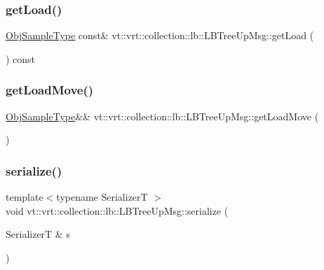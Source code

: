 \subsubsection{\texorpdfstring{get\+Load()}{getLoad()}}
{\footnotesize\ttfamily \hyperlink{structvt_1_1vrt_1_1collection_1_1lb_1_1_hier_l_b_types_a597a60d517207b90e8c7984eac434e8f}{Obj\+Sample\+Type} const\& vt\+::vrt\+::collection\+::lb\+::\+L\+B\+Tree\+Up\+Msg\+::get\+Load (\begin{DoxyParamCaption}{ }\end{DoxyParamCaption}) const\hspace{0.3cm}{\ttfamily [inline]}}

\mbox{\label{structvt_1_1vrt_1_1collection_1_1lb_1_1_l_b_tree_up_msg_aa5c9744fbb8557e3ec37846d9c8e09e7}} 
\subsubsection{\texorpdfstring{get\+Load\+Move()}{getLoadMove()}}
{\footnotesize\ttfamily \hyperlink{structvt_1_1vrt_1_1collection_1_1lb_1_1_hier_l_b_types_a597a60d517207b90e8c7984eac434e8f}{Obj\+Sample\+Type}\&\& vt\+::vrt\+::collection\+::lb\+::\+L\+B\+Tree\+Up\+Msg\+::get\+Load\+Move (\begin{DoxyParamCaption}{ }\end{DoxyParamCaption})\hspace{0.3cm}{\ttfamily [inline]}}

\mbox{\label{structvt_1_1vrt_1_1collection_1_1lb_1_1_l_b_tree_up_msg_a6d948678b6361cbaa753d878b72fbce8}} 
\subsubsection{\texorpdfstring{serialize()}{serialize()}}
{\footnotesize\ttfamily template$<$typename SerializerT $>$ \\
void vt\+::vrt\+::collection\+::lb\+::\+L\+B\+Tree\+Up\+Msg\+::serialize (\begin{DoxyParamCaption}\item[{SerializerT \&}]{s }\end{DoxyParamCaption})\hspace{0.3cm}{\ttfamily [inline]}}


